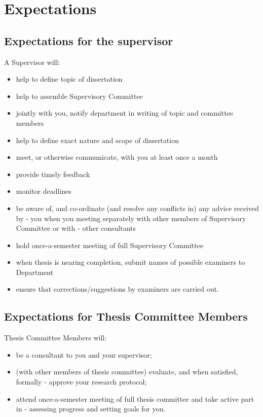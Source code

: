 \documentclass[
  openany]{book}
\providecommand{\tightlist}{%
  \setlength{\itemsep}{0pt}\setlength{\parskip}{0pt}}
\begin{document}
\hypertarget{expectations}{%
\section{Expectations}\label{expectations}}

\hypertarget{expectations-for-the-supervisor}{%
\subsection{Expectations for the supervisor}\label{expectations-for-the-supervisor}}

A Supervisor will:

\begin{itemize}
\tightlist
\item
  help to define topic of dissertation
\item
  help to assemble Supervisory Committee
\item
  jointly with you, notify department in writing of topic and committee members
\item
  help to define exact nature and scope of dissertation
\item
  meet, or otherwise communicate, with you at least once a month
\item
  provide timely feedback
\item
  monitor deadlines
\item
  be aware of, and co-ordinate (and resolve any conflicts in) any advice received by - you when you meeting separately with other members of Supervisory Committee or with - other consultants
\item
  hold once-a-semester meeting of full Supervisory Committee
\item
  when thesis is nearing completion, submit names of possible examiners to Department
\item
  ensure that corrections/suggestions by examiners are carried out.
\end{itemize}

\hypertarget{expectations-for-thesis-committee-members}{%
\subsection{Expectations for Thesis Committee Members}\label{expectations-for-thesis-committee-members}}

Thesis Committee Members will:

\begin{itemize}
\tightlist
\item
  be a consultant to you and your supervisor;
\item
  (with other members of thesis committee) evaluate, and when satisfied, formally - approve your research protocol;
\item
  attend once-a-semester meeting of full thesis committee and take active part in - assessing progress and setting goals for you.
\end{itemize}
\end{document}
